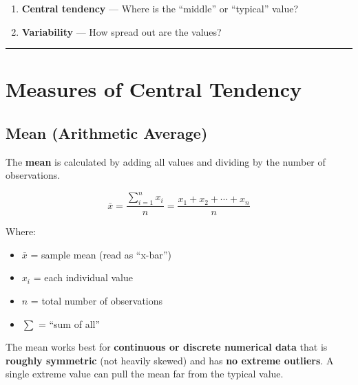 \documentclass[
  12pt,
  letterpaper,
]{book}
\providecommand{\tightlist}{%
  \setlength{\itemsep}{0pt}\setlength{\parskip}{0pt}}
\begin{document}
\begin{enumerate}
\def\labelenumi{\arabic{enumi}.}
\tightlist
\item
  \textbf{Central tendency} --- Where is the ``middle'' or ``typical''
  value?
\item
  \textbf{Variability} --- How spread out are the values?
\end{enumerate}

\begin{center}\rule{0.5\linewidth}{0.5pt}\end{center}

\section{Measures of Central
Tendency}\label{measures-of-central-tendency}

\subsection{Mean (Arithmetic Average)}\label{mean-arithmetic-average}

The \textbf{mean} is calculated by adding all values and dividing by the
number of observations.

\[\bar{x} = \frac{\sum_{i=1}^{n} x_i}{n} = \frac{x_1 + x_2 + \cdots + x_n}{n}\]

Where:

\begin{itemize}
\tightlist
\item
  \(\bar{x}\) = sample mean (read as ``x-bar'')
\item
  \(x_i\) = each individual value
\item
  \(n\) = total number of observations
\item
  \(\sum\) = ``sum of all''
\end{itemize}

\begin{tcolorbox}[enhanced jigsaw, arc=.35mm, bottomrule=.15mm, bottomtitle=1mm, breakable, colback=white, colbacktitle=quarto-callout-warning-color!10!white, colframe=quarto-callout-warning-color-frame, coltitle=black, left=2mm, leftrule=.75mm, opacityback=0, opacitybacktitle=0.6, rightrule=.15mm, title={⚠️ When to Use the Mean}, titlerule=0mm, toprule=.15mm, toptitle=1mm]

The mean works best for \textbf{continuous or discrete numerical data}
that is \textbf{roughly symmetric} (not heavily skewed) and has
\textbf{no extreme outliers}. A single extreme value can pull the mean
far from the typical value.

\end{tcolorbox}
\end{document}
